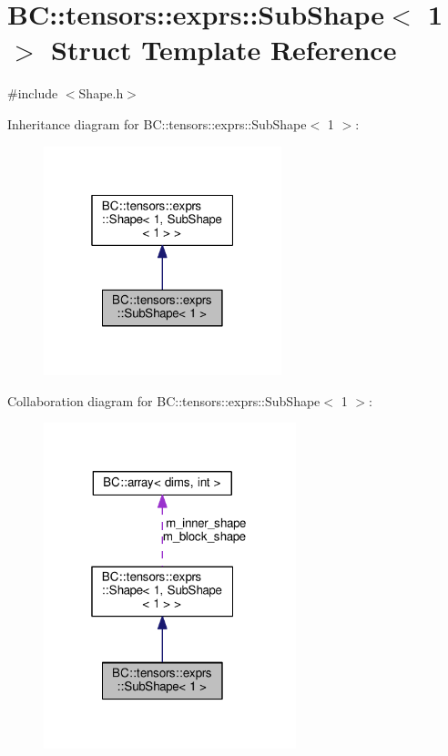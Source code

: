 \hypertarget{structBC_1_1tensors_1_1exprs_1_1SubShape_3_011_01_4}{}\section{BC\+:\+:tensors\+:\+:exprs\+:\+:Sub\+Shape$<$ 1 $>$ Struct Template Reference}
\label{structBC_1_1tensors_1_1exprs_1_1SubShape_3_011_01_4}


{\ttfamily \#include $<$Shape.\+h$>$}



Inheritance diagram for BC\+:\+:tensors\+:\+:exprs\+:\+:Sub\+Shape$<$ 1 $>$\+:
\nopagebreak
\begin{figure}[H]
\begin{center}
\leavevmode
\includegraphics[width=196pt]{structBC_1_1tensors_1_1exprs_1_1SubShape_3_011_01_4__inherit__graph}
\end{center}
\end{figure}


Collaboration diagram for BC\+:\+:tensors\+:\+:exprs\+:\+:Sub\+Shape$<$ 1 $>$\+:
\nopagebreak
\begin{figure}[H]
\begin{center}
\leavevmode
\includegraphics[width=208pt]{structBC_1_1tensors_1_1exprs_1_1SubShape_3_011_01_4__coll__graph}
\end{center}
\end{figure}
